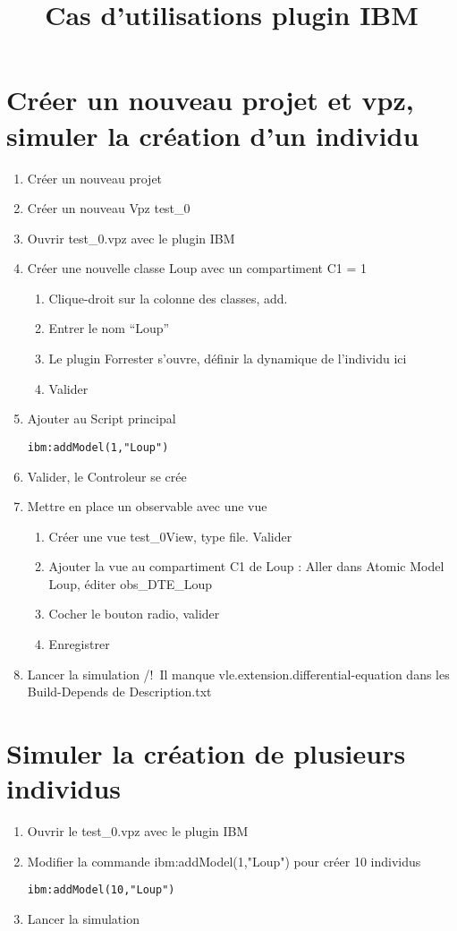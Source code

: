 \documentclass[a4paper,11pt,final]{article}
\title{\textbf{Cas d'utilisations plugin IBM}}
\author{}
\date{}
\begin{document}
\maketitle

\section{Créer un nouveau projet et vpz, simuler la création d'un individu}

\begin{enumerate}
  \item Créer un nouveau projet
  \item Créer un nouveau Vpz test\_0
  \item Ouvrir test\_0.vpz avec le plugin IBM
  \item Créer une nouvelle classe Loup avec un compartiment C1 = 1
  \begin{enumerate}
  	\item Clique-droit sur la colonne des classes, add.
  	\item Entrer le nom ``Loup''
  	\item Le plugin Forrester s'ouvre, définir la dynamique de l'individu ici
  	\item Valider
  \end{enumerate}
  \item Ajouter au Script principal
\begin{lstlisting}[frame=single]
ibm:addModel(1,"Loup")
\end{lstlisting}
  \item Valider, le Controleur se crée
  \item Mettre en place un observable avec une vue
  \begin{enumerate}
	  \item Créer une vue test\_0View, type file. Valider
	  \item Ajouter la vue au compartiment C1 de Loup : Aller dans Atomic Model Loup, éditer obs\_DTE\_Loup
	  \item Cocher le bouton radio, valider
	  \item Enregistrer
  \end{enumerate}
  \item Lancer la simulation /!\ Il manque vle.extension.differential-equation dans les Build-Depends de Description.txt
\end{enumerate}

\section{Simuler la création de plusieurs individus}
\begin{enumerate}
	  \item Ouvrir le test\_0.vpz avec le plugin IBM
	  \item Modifier la commande ibm\string:addModel(1,"Loup") pour créer 10 individus
	  \begin{lstlisting}[frame=single]
ibm:addModel(10,"Loup")
\end{lstlisting}
	  \item Lancer la simulation
\end{enumerate}
\end{document}
